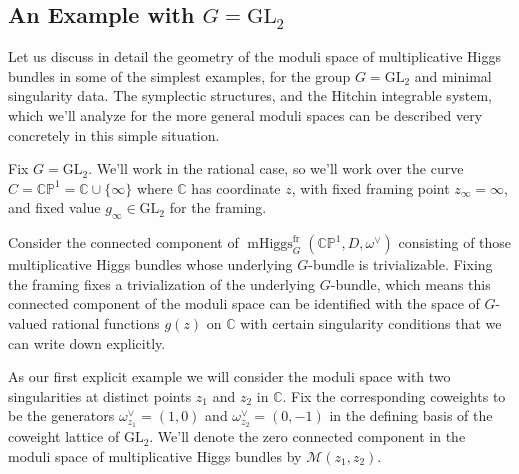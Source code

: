 \documentclass[11pt, oneside, reqno]{amsart}
\theoremstyle{definition} \newtheorem{definition}{Definition}[section]
\theoremstyle{definition} \newtheorem{remark}[definition]{Remark}
\theoremstyle{definition} \newtheorem{remarks}[definition]{Remarks}
\theoremstyle{definition} \newtheorem{question}[definition]{Question}
\theoremstyle{definition} \newtheorem*{note}{Note}
\theoremstyle{definition} \newtheorem{example}[definition]{Example}
\theoremstyle{definition} \newtheorem{examples}[definition]{Examples}
\newcommand{\bb}[1]{\mathbb{#1}}
\newcommand{\mc}[1]{\mathcal{#1}}
\newcommand{\CC}{\mathbb{C}}
\newcommand{\GL}{\mathrm{GL}}
\DeclareMathOperator{\mhiggs}{mHiggs}
\newcommand{\fr}{\mathrm{fr}}
\begin{document}
\subsection{An Example with $G=\GL_2$} \label{GL2_example_section}

Let us discuss in detail the geometry of the moduli space of multiplicative Higgs bundles in some of the simplest examples, for the group $G = \GL_2$ and minimal singularity data.  The symplectic structures, and the Hitchin integrable system, which we'll analyze for the more general moduli spaces can be described very concretely in this simple situation. 

Fix $G=\GL_2$.  We'll work in the rational case, so we'll work over the curve $C = \bb{CP}^1 = \CC \cup \{\infty\}$ where $\CC$ has coordinate $z$, with fixed framing point $z_\infty = \infty$, and fixed value $g_\infty \in \GL_2$ for the framing. 

Consider the connected component of $\mhiggs^\fr_{G}(\bb{CP}^1, D, \omega^{\vee})$ consisting of those multiplicative Higgs bundles whose underlying $G$-bundle is trivializable.  Fixing the framing fixes a trivialization of the underlying $G$-bundle, which means this connected component of the moduli space can be identified with the space of $G$-valued
rational functions $g(z)$ on $\CC$ with certain singularity conditions that we can write down explicitly.

As our first explicit example we will consider the moduli space with two singularities at distinct points $z_1$ and $z_2$ in $\CC$.  Fix the corresponding coweights to be the generators $\omega^\vee_{z_1} = (1,0)$ and $\omega^\vee_{z_2} = (0,-1)$ in the defining basis of the coweight lattice of $\GL_2$.  We'll denote the zero connected component in the moduli space of multiplicative Higgs bundles by $\mc M(z_1,z_2)$.
 
\end{document}
